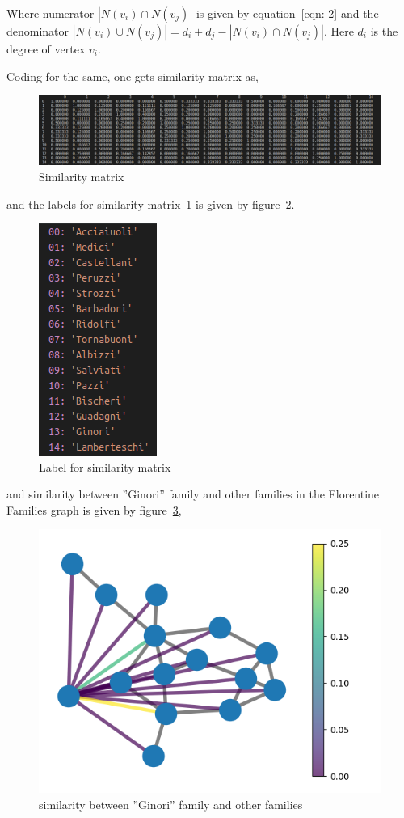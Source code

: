 \documentclass[11pt]{article}
\begin{document}
	Where numerator $\left|N\left(v_i\right) \cap N\left(v_j\right)\right|$ is given by equation~\ref{eqn: 2} and the denominator $\left|N\left(v_i\right) \cup N\left(v_j\right)\right| = d_{i} + d_{j} - \left|N\left(v_i\right) \cap N\left(v_j\right)\right|$. Here $d_{i}$ is the degree of vertex $v_{i}$. 
	
	
	Coding for the same, one gets similarity matrix as,
	
	\begin{figure}[!h]
		\centering
		\includegraphics[scale=0.3]{Similarity_matrix.png}
		\caption{Similarity matrix}
		\label{fig:similarity matrix}
	\end{figure}

and the labels for similarity matrix~\ref{fig:similarity matrix} is given by figure~\ref{fig:my_label}. 

	\begin{figure}
	\centering
	\includegraphics[scale=0.7]{labels.png}
	\caption{Label for similarity matrix}
	\label{fig:my_label}
\end{figure}

	and similarity between ”Ginori” family and other families in the Florentine Families graph is given by figure~\ref{Ginori_similar},
	
	\begin{figure}
	\centering
	\includegraphics[scale=0.5]{Ginori.png}
	\caption{similarity between ”Ginori” family and other families}
	\label{Ginori_similar}
\end{figure}	
	
\end{document}
